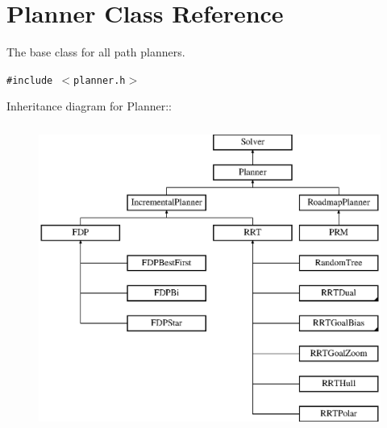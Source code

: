 \section{Planner  Class Reference}
\label{class_Planner}
The base class for all path planners. 


{\tt \#include $<$planner.h$>$}

Inheritance diagram for Planner::\begin{figure}[H]
\begin{center}
\leavevmode
\includegraphics[height=10cm]{class_Planner}
\end{center}
\end{figure}

